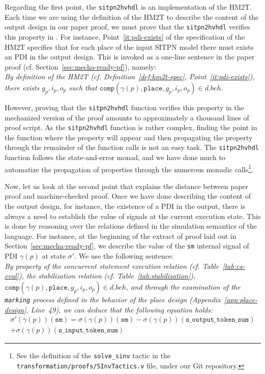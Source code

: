\documentclass[pdflatex,sn-mathphys]{sn-jnl}%
\theoremstyle{thmstyleone}%
\theoremstyle{thmstyletwo}%
\theoremstyle{thmstylethree}%
\begin{document}
Regarding the first point, the \texttt{sitpn2hvhdl} is an \coq{}
implementation of the HM2T. Each time we are using the definition of
the HM2T to describe the content of the output design in our paper
proof, we must prove that the \texttt{sitpn2hvhdl} verifies this
property in \coq{}. For instance, Point~\ref{it:pdi-exists} of the
specification of the HM2T specifies that for each place of the input
SITPN model there must exists an PDI in the output design. This is
invoked as a one-line sentence in the
paper proof (cf. Section~\ref{sec:mecha-ready-pf}), namely:\\

\textit{By definition of the HM2T (cf. Definition~\ref{def:hm2t-spec},
  Point~\ref{it:pdi-exists}), there exists $g_p,i_p,o_p$ such that
  $\mathtt{comp}(\gamma(p),\mathtt{place},g_p,i_p,o_p)\in{}d.beh$.}

\bigskip

However, proving that the \texttt{sitpn2hvhdl} function verifies this
property in the mechanized version of the proof amounts to
approximately a thousand lines of proof script. As the
\texttt{sitpn2hvhdl} function is rather complex, finding the point in
the function where the property will appear and then propagating the
property through the remainder of the function calls is not an easy
task.  The \texttt{sitpn2hvhdl} function follows the state-and-error
monad, and we have done much to automatize the propagation of
properties through the numerous monadic calls\footnote{See the
  definition of the \texttt{solve\_sinv} tactic in the
  \texttt{transformation/proofs/SInvTactics.v} file, under our
  \textsf{Git} repository.}.

Now, let us look at the second point that explains the distance
between paper proof and machine-checked proof. Once we have done
describing the content of the output design, for instance, the
existence of a PDI in the output, there is always a need to establish
the value of signals at the current execution state. This is done by
reasoning over the relations defined in the simulation semantics of
the \hvhdl{} language. For instance, at the beginning of the extract
of proof laid out in Section~\ref{sec:mecha-ready-pf}, we describe the
value of the \texttt{sm} internal signal of PDI $\gamma(p)$ at state
$\sigma'$. We use the following sentence: \\

\textit{By property of the \hvhdl{} concurrent statement execution
  relation (cf. Table~\ref{tab:cs-eval}), the stabilization relation
  (cf. Table~\ref{tab:stabilization}),
  $\mathtt{comp}(\gamma(p),\mathtt{place},g_p,i_p,o_p)\in{}d.beh$, and
  through the examination of the \texttt{marking} process defined in
  the behavior of the place design (Appendix~\ref{app:place-design},
  Line~49), we can deduce that the following equation holds:}
\begin{equation*}
  \begin{split}
    \sigma'(\gamma(p))(\texttt{sm})=\sigma(\gamma(p))(\texttt{sm})-\sigma(\gamma(p))(\texttt{s\_output\_token\_sum})\\
    +\sigma(\gamma(p))(\texttt{s\_input\_token\_sum})
  \end{split}
\end{equation*}
\end{document}
